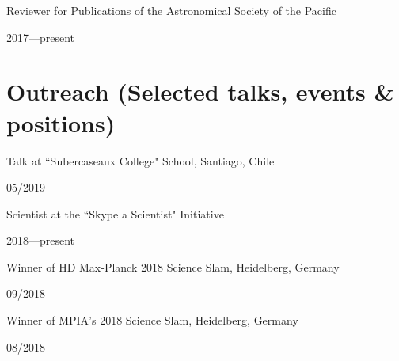 \documentclass[12pt, a4paper]{article} %
\begin{document}
\begin{minipage}[t]{0.7\textwidth}
\begin{flushleft}%
  \setlength{\leftskip}{0.2cm}%
Reviewer for Publications of the Astronomical Society of the Pacific 
\end{flushleft}
\end{minipage}
\begin{minipage}[t]{0.3\textwidth}
\hfill 2017---present
\end{minipage}

\section*{Outreach (Selected talks, events \& positions)}

\begin{minipage}[t]{0.7\textwidth}
\begin{flushleft}%
  \setlength{\leftskip}{0.2cm}%
Talk at ``Subercaseaux College" School, Santiago, Chile
\end{flushleft}
\end{minipage}
\begin{minipage}[t]{0.3\textwidth}
\hfill 05/2019
\end{minipage}

\begin{minipage}[t]{0.7\textwidth}
\begin{flushleft}%
  \setlength{\leftskip}{0.2cm}%
Scientist at the ``Skype a Scientist" Initiative
\end{flushleft}
\end{minipage}
\begin{minipage}[t]{0.3\textwidth}
\hfill 2018---present
\end{minipage}

\begin{minipage}[t]{0.7\textwidth}
\begin{flushleft}%
  \setlength{\leftskip}{0.2cm}%
Winner of HD Max-Planck 2018 Science Slam, Heidelberg, Germany 
\end{flushleft}
\end{minipage}
\begin{minipage}[t]{0.3\textwidth}
\hfill 09/2018
\end{minipage}

\begin{minipage}[t]{0.7\textwidth}
\begin{flushleft}%
  \setlength{\leftskip}{0.2cm}%
Winner of MPIA's 2018 Science Slam, Heidelberg, Germany 
\end{flushleft}
\end{minipage}
\begin{minipage}[t]{0.3\textwidth}
\hfill 08/2018
\end{minipage}
\end{document}
